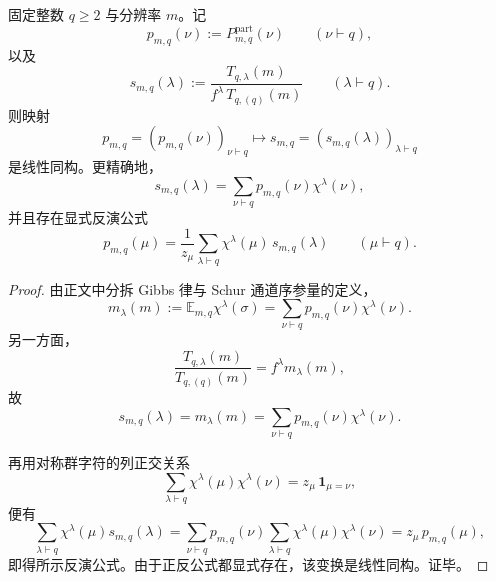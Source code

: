 \begin{theorem}\label{thm:conclusion-schur-gibbs-signature-complete-invertibility}
固定整数 \(q\ge 2\) 与分辨率 \(m\)。记
\[
p_{m,q}(\nu):=P^{\mathrm{part}}_{m,q}(\nu)
\qquad(\nu\vdash q),
\]
以及
\[
s_{m,q}(\lambda):=
\frac{T_{q,\lambda}(m)}{f^\lambda\,T_{q,(q)}(m)}
\qquad(\lambda\vdash q).
\]
则映射
\[
p_{m,q}=(p_{m,q}(\nu))_{\nu\vdash q}
\longmapsto
s_{m,q}=(s_{m,q}(\lambda))_{\lambda\vdash q}
\]
是线性同构。更精确地，
\[
s_{m,q}(\lambda)=\sum_{\nu\vdash q}p_{m,q}(\nu)\chi^\lambda(\nu),
\]
并且存在显式反演公式
\[
p_{m,q}(\mu)=\frac1{z_\mu}\sum_{\lambda\vdash q}\chi^\lambda(\mu)\,s_{m,q}(\lambda)
\qquad(\mu\vdash q).
\]
\end{theorem}
\begin{proof}
由正文中分拆 Gibbs 律与 Schur 通道序参量的定义，
\[
m_\lambda(m):=\mathbb E_{m,q}\chi^\lambda(\sigma)
=
\sum_{\nu\vdash q}p_{m,q}(\nu)\chi^\lambda(\nu).
\]
另一方面，
\[
\frac{T_{q,\lambda}(m)}{T_{q,(q)}(m)}=f^\lambda m_\lambda(m),
\]
故
\[
s_{m,q}(\lambda)=m_\lambda(m)
=
\sum_{\nu\vdash q}p_{m,q}(\nu)\chi^\lambda(\nu).
\]

再用对称群字符的列正交关系
\[
\sum_{\lambda\vdash q}\chi^\lambda(\mu)\chi^\lambda(\nu)=z_\mu\,\mathbf 1_{\mu=\nu},
\]
便有
\[
\sum_{\lambda\vdash q}\chi^\lambda(\mu)s_{m,q}(\lambda)
=
\sum_{\nu\vdash q}p_{m,q}(\nu)
\sum_{\lambda\vdash q}\chi^\lambda(\mu)\chi^\lambda(\nu)
=
z_\mu\,p_{m,q}(\mu),
\]
即得所示反演公式。由于正反公式都显式存在，该变换是线性同构。证毕。
\end{proof}

